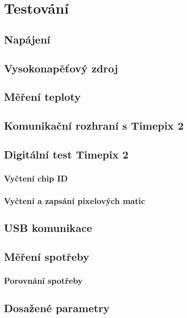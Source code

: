 \chapter{Testování}
\section{Napájení}

\section{Vysokonapěťový zdroj}
 
\section{Měření teploty}
\section{Komunikační rozhraní s Timepix 2}		%

\section{Digitální test Timepix 2} %
	\subsection{Vyčtení chip ID}
	\subsection{}
	\subsection{Vyčtení a zapsání pixelových matic}
\section{USB komunikace}

\section{Měření spotřeby}
	\subsection{Porovnání spotřeby}
	\section{Dosažené parametry}